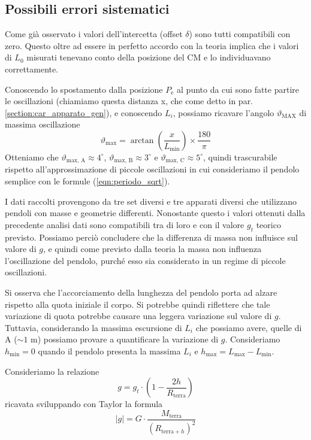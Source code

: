 \documentclass[italian, a4paper, 10pt, twocolumn]{../../style/lab_unige}
\newcommand{\refeqn}[1]{({\ref{#1})}}%
\begin{document}
  \subsection{Possibili errori sistematici}
  
  Come già osservato i valori dell'intercetta (offset $\delta$) sono tutti compatibili con zero. 
  Questo oltre ad essere in perfetto accordo con la teoria implica che i valori di $L_{0}$ misurati 
  tenevano conto della posizione del CM e lo individuavano correttamente.

  Conoscendo lo spostamento dalla posizione $P_{\text{e}}$ al punto da cui sono fatte partire le 
  oscillazioni (chiamiamo questa distanza x, che come detto in par. \ref{section:car_apparato_gen}), e conoscendo $L_{i}$, 
  possiamo ricavare l'angolo $\vartheta_{\text{MAX}}$ di massima oscillazione
  \[
  \vartheta_{\text{max}}=\arctan\left(\frac{x}{L_{\text{min}}}\right)\times\frac{180}{\pi}
  \]
  Otteniamo che $\vartheta_{\text{max, A}}\approx4^\circ$, $\vartheta_{\text{max, B}}\approx3^\circ$ e 
  $\vartheta_{\text{max, C}}\approx5^\circ$, quindi trascurabile rispetto all'approssimazione di piccole 
  oscillazioni in cui consideriamo il pendolo semplice con le formule \refeqn{eqn:periodo_sqrt}.

  I dati raccolti provengono da tre set diversi e tre apparati diversi che utilizzano pendoli con 
  masse e geometrie differenti. Nonostante questo i valori ottenuti dalla precedente analisi dati 
  sono compatibili tra di loro e con il valore $g_{t}$ teorico previsto. Possiamo perciò concludere 
  che la differenza di massa non influisce sul valore di $g$, e quindi come previsto dalla teoria 
  la massa non influenza l'oscillazione del pendolo, purché esso sia considerato in un regime di 
  piccole oscillazioni.

  Si osserva che l'accorciamento della lunghezza del pendolo porta ad alzare rispetto alla quota iniziale il corpo.
  Si potrebbe quindi riflettere che tale variazione di quota potrebbe causare una leggera variazione sul valore 
  di $g$. Tuttavia, considerando la massima escursione di $L_{i}$ che possiamo avere, quelle di A ($\sim1$ m)
  possiamo provare a quantificare la variazione di $g$. Consideriamo $h_{\text{min}}=0$ quando il pendolo presenta la
  massima $L_{i}$ e $h_{\text{max}}=L_{\text{max}}-L_{\text{min}}$. 
  
  Consideriamo la relazione
  \[g=g_{t}\cdot\left(1-\frac{2h}{R_{\text{terra}}}\right)\]
  ricavata sviluppando con Taylor la formula
  \[|g|=G\cdot\frac{M_{\text{terra}}}{\left(R_{\text{terra}+h}\right)^{2}}\]
\end{document}
